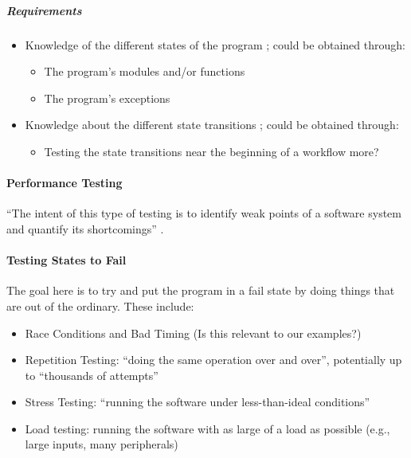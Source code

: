\subparagraph{Requirements}
\begin{itemize}
      \item Knowledge of the different states of the program
            \cite[p.~82]{patton_software_2006}; could be obtained through:
            \begin{itemize}
                  \item The program's modules and/or functions
                  \item The program's exceptions
            \end{itemize}
      \item Knowledge about the different state transitions
            \cite[p.~82]{patton_software_2006}; could be obtained through:
            \begin{itemize}
                  \item Testing the state transitions near the beginning of a
                        workflow more?
            \end{itemize}
\end{itemize}

\paragraph{Performance Testing}

``The intent of this type of testing is to identify weak points of a software
system and quantify its shortcomings'' \cite[p.~447]{peters_software_2000}.

\paragraph{Testing States to Fail \cite[pp.~84-87]{patton_software_2006}}

The goal here is to try and put the program in a fail state by doing things
that are out of the ordinary. These include:

\begin{itemize}
      \item Race Conditions and Bad Timing \cite[pp.~85-86]{patton_software_2006}
            (Is this relevant to our examples?)
      \item Repetition Testing: ``doing the same operation over and over'',
            potentially up to ``thousands of attempts''
            \cite[p.~86]{patton_software_2006}
      \item Stress Testing: ``running the software under less-than-ideal
            conditions'' \cite[p.~86]{patton_software_2006}
      \item Load testing: running the software with as large of a load as
            possible (e.g., large inputs, many peripherals)
            \cite[p.~86]{patton_software_2006}
\end{itemize}

